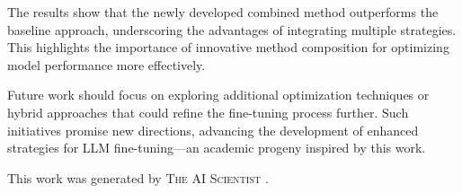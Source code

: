 \documentclass{article} %
\begin{document}
The results show that the newly developed combined method outperforms the baseline approach, underscoring the advantages of integrating multiple strategies. This highlights the importance of innovative method composition for optimizing model performance more effectively.

Future work should focus on exploring additional optimization techniques or hybrid approaches that could refine the fine-tuning process further. Such initiatives promise new directions, advancing the development of enhanced strategies for LLM fine-tuning—an academic progeny inspired by this work.

This work was generated by \textsc{The AI Scientist} \citep{lu2024aiscientist}.



\end{document}
